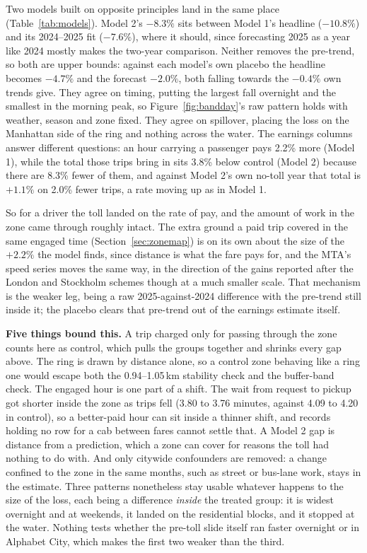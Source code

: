 \documentclass[11pt]{article}
\begin{document}
Two models built on opposite principles land in the same place (Table~\ref{tab:models}). Model 2's $-8.3\%$ sits between Model 1's headline ($-10.8\%$) and its 2024--2025 fit ($-7.6\%$), where it should, since forecasting 2025 as a year like 2024 mostly makes the two-year comparison. Neither removes the pre-trend, so both are upper bounds: against each model's own placebo the headline becomes $-4.7\%$ and the forecast $-2.0\%$, both falling towards the $-0.4\%$ own trends give. They agree on timing, putting the largest fall overnight and the smallest in the morning peak, so Figure~\ref{fig:bandday}'s raw pattern holds with weather, season and zone fixed. They agree on spillover, placing the loss on the Manhattan side of the ring and nothing across the water. The earnings columns answer different questions: an hour carrying a passenger pays 2.2\% more (Model 1), while the total those trips bring in sits 3.8\% below control (Model 2) because there are 8.3\% fewer of them, and against Model 2's own no-toll year that total is $+1.1\%$ on 2.0\% fewer trips, a rate moving up as in Model 1.

So for a driver the toll landed on the rate of pay, and the amount of work in the zone came through roughly intact. The extra ground a paid trip covered in the same engaged time (Section~\ref{sec:zonemap}) is on its own about the size of the $+2.2\%$ the model finds, since distance is what the fare pays for, and the MTA's speed series \cite{mtacbdspeeds} moves the same way, in the direction of the gains reported after the London and Stockholm schemes \cite{leape2006, eliasson2009} though at a much smaller scale. That mechanism is the weaker leg, being a raw 2025-against-2024 difference with the pre-trend still inside it; the placebo clears that pre-trend out of the earnings estimate itself.

\textbf{Five things bound this.} A trip charged only for passing through the zone counts here as control, which pulls the groups together and shrinks every gap above. The ring is drawn by distance alone, so a control zone behaving like a ring one would escape both the 0.94--1.05\,km stability check and the buffer-band check. The engaged hour is one part of a shift. The wait from request to pickup got shorter inside the zone as trips fell (3.80 to 3.76 minutes, against 4.09 to 4.20 in control), so a better-paid hour can sit inside a thinner shift, and records holding no row for a cab between fares cannot settle that. A Model 2 gap is distance from a prediction, which a zone can cover for reasons the toll had nothing to do with. And only citywide confounders are removed: a change confined to the zone in the same months, such as street or bus-lane work, stays in the estimate. Three patterns nonetheless stay usable whatever happens to the size of the loss, each being a difference \emph{inside} the treated group: it is widest overnight and at weekends, it landed on the residential blocks, and it stopped at the water. Nothing tests whether the pre-toll slide itself ran faster overnight or in Alphabet City, which makes the first two weaker than the third.
\end{document}
